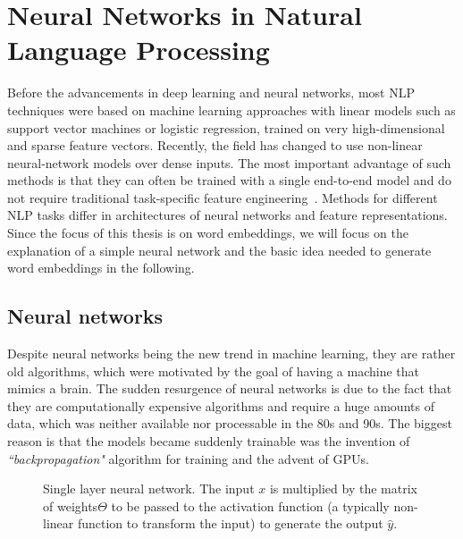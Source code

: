 \section{Neural Networks in Natural Language Processing}\label{sec:nn}
Before the advancements in deep learning and neural networks, most NLP techniques were based on machine learning approaches with linear models such as support vector machines or logistic regression, trained on very high-dimensional and sparse feature vectors. Recently, the field has changed to use non-linear neural-network models over dense inputs. The most important advantage of such methods is that they can often be trained with a single end-to-end model and do not require traditional task-specific feature engineering~. Methods for different NLP tasks differ in architectures of neural networks and feature representations. Since the focus of this thesis is on word embeddings, we will focus on the explanation of a simple neural network and the basic idea needed to generate word embeddings in the following. 

\subsection{Neural networks}
Despite neural networks being the new trend in machine learning, they are rather old algorithms, which were motivated by the goal of having a machine that mimics a brain. The sudden resurgence of neural networks is due to the fact that they are computationally expensive algorithms and require a huge amounts of data, which was neither available nor processable in the 80s and 90s. The biggest reason is that the models became suddenly trainable was the invention of \emph{``backpropagation"} algorithm for training and the advent of GPUs. 
\\
\begin{figure}
\centering 
\resizebox{0.55\textwidth}{0.3\textwidth}{      

}
\caption{Single layer neural network. The input $x$ is multiplied by the matrix of weights$\Theta$ to be passed to the activation function (a typically non-linear function to transform the input) to generate the output $\hat { y }$. \protect \footnotemark}
\label{fig:preceptron}
\end{figure}

